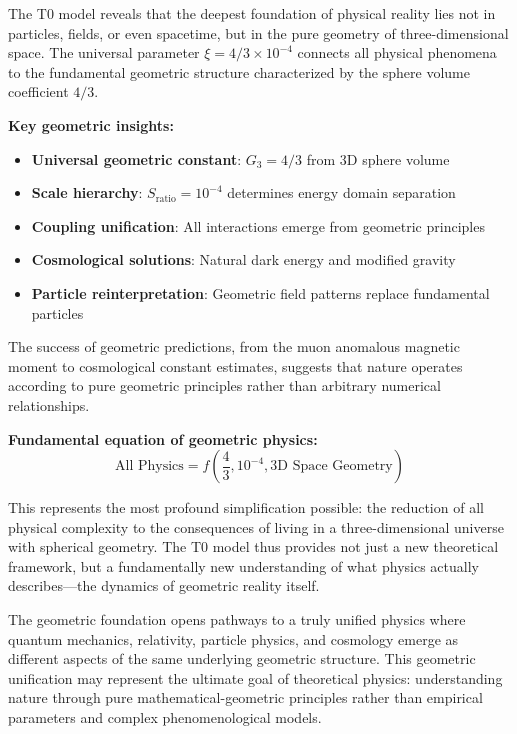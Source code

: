 \documentclass[12pt,a4paper]{report}
\begin{document}
	The T0 model reveals that the deepest foundation of physical reality lies not in particles, fields, or even spacetime, but in the pure geometry of three-dimensional space. The universal parameter $\xi = 4/3 \times 10^{-4}$ connects all physical phenomena to the fundamental geometric structure characterized by the sphere volume coefficient $4/3$.
	
	\textbf{Key geometric insights:}
	
	\begin{itemize}
		\item \textbf{Universal geometric constant}: $G_3 = 4/3$ from 3D sphere volume
		\item \textbf{Scale hierarchy}: $S_{\text{ratio}} = 10^{-4}$ determines energy domain separation
		\item \textbf{Coupling unification}: All interactions emerge from geometric principles
		\item \textbf{Cosmological solutions}: Natural dark energy and modified gravity
		\item \textbf{Particle reinterpretation}: Geometric field patterns replace fundamental particles
	\end{itemize}
	
	The success of geometric predictions, from the muon anomalous magnetic moment to cosmological constant estimates, suggests that nature operates according to pure geometric principles rather than arbitrary numerical relationships.
	
	\textbf{Fundamental equation of geometric physics:}
	\begin{equation}
		\boxed{\text{All Physics} = f\left(\frac{4}{3}, 10^{-4}, \text{3D Space Geometry}\right)}
	\end{equation}
	
	This represents the most profound simplification possible: the reduction of all physical complexity to the consequences of living in a three-dimensional universe with spherical geometry. The T0 model thus provides not just a new theoretical framework, but a fundamentally new understanding of what physics actually describes—the dynamics of geometric reality itself.
	
	The geometric foundation opens pathways to a truly unified physics where quantum mechanics, relativity, particle physics, and cosmology emerge as different aspects of the same underlying geometric structure. This geometric unification may represent the ultimate goal of theoretical physics: understanding nature through pure mathematical-geometric principles rather than empirical parameters and complex phenomenological models.
	
\end{document}
